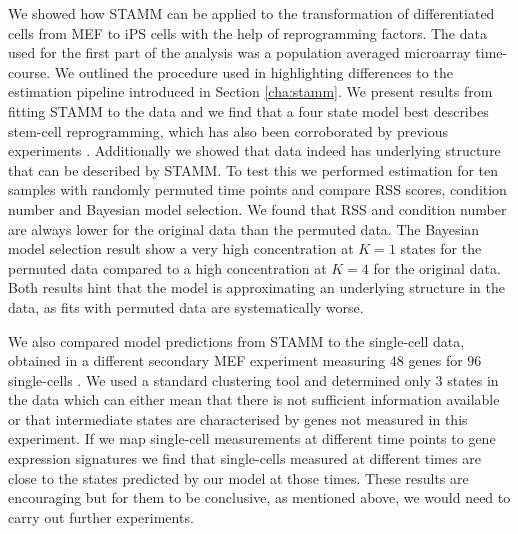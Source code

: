 We showed how STAMM can be applied to the transformation of differentiated cells from MEF to iPS cells with the help of reprogramming factors. The data used for the first part of the analysis was a population averaged microarray time-course. We outlined the procedure used in \cite{Armond:2013} highlighting differences to the estimation pipeline introduced in Section \ref{cha:stamm}. We present results from fitting STAMM to the data and we find that a four state model best describes stem-cell reprogramming, which has also been corroborated by previous experiments \citep{SamavarchiTehrani:2010cp}. Additionally we showed that data indeed has underlying  structure that can be described by STAMM. To test this we performed estimation for ten samples with randomly permuted time points and compare RSS scores, condition number and Bayesian model selection. We found that RSS and condition number are always lower for the original data than the permuted data. The Bayesian model selection result show a very high concentration at $K=1$ states for the permuted data compared to a high concentration at $K=4$ for the original data. Both results hint that the model is approximating an underlying structure in the data, as fits with permuted data are systematically worse.

We also compared model predictions from STAMM to the single-cell data, obtained in a different secondary MEF experiment measuring $48$ genes for $96$ single-cells \citep{Buganim:2012hp}. We used a standard clustering tool and determined only $3$ states in the data which can either mean that there is not sufficient information available or that intermediate states are characterised by genes not measured in this experiment. If we map single-cell measurements at different time points to gene expression signatures we find that single-cells measured at different times are close to the states predicted by our model at those times. These results are encouraging but for them to be conclusive, as mentioned above, we would need to carry out further experiments.


